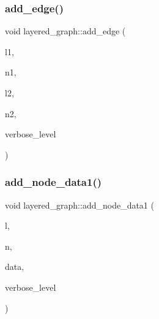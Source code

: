 \subsubsection{\texorpdfstring{add\+\_\+edge()}{add\_edge()}}
{\footnotesize\ttfamily void layered\+\_\+graph\+::add\+\_\+edge (\begin{DoxyParamCaption}\item[{\mbox{\hyperlink{galois_8h_a09fddde158a3a20bd2dcadb609de11dc}{I\+NT}}}]{l1,  }\item[{\mbox{\hyperlink{galois_8h_a09fddde158a3a20bd2dcadb609de11dc}{I\+NT}}}]{n1,  }\item[{\mbox{\hyperlink{galois_8h_a09fddde158a3a20bd2dcadb609de11dc}{I\+NT}}}]{l2,  }\item[{\mbox{\hyperlink{galois_8h_a09fddde158a3a20bd2dcadb609de11dc}{I\+NT}}}]{n2,  }\item[{\mbox{\hyperlink{galois_8h_a09fddde158a3a20bd2dcadb609de11dc}{I\+NT}}}]{verbose\+\_\+level }\end{DoxyParamCaption})}

\mbox{\label{classlayered__graph_a8385de4bc26e9dd88066e55d3cb9bd4b}} 
\subsubsection{\texorpdfstring{add\+\_\+node\+\_\+data1()}{add\_node\_data1()}}
{\footnotesize\ttfamily void layered\+\_\+graph\+::add\+\_\+node\+\_\+data1 (\begin{DoxyParamCaption}\item[{\mbox{\hyperlink{galois_8h_a09fddde158a3a20bd2dcadb609de11dc}{I\+NT}}}]{l,  }\item[{\mbox{\hyperlink{galois_8h_a09fddde158a3a20bd2dcadb609de11dc}{I\+NT}}}]{n,  }\item[{\mbox{\hyperlink{galois_8h_a09fddde158a3a20bd2dcadb609de11dc}{I\+NT}}}]{data,  }\item[{\mbox{\hyperlink{galois_8h_a09fddde158a3a20bd2dcadb609de11dc}{I\+NT}}}]{verbose\+\_\+level }\end{DoxyParamCaption})}

\mbox{\label{classlayered__graph_a2d72d0538b4908cc0c0c24b4af7c9154}} 
